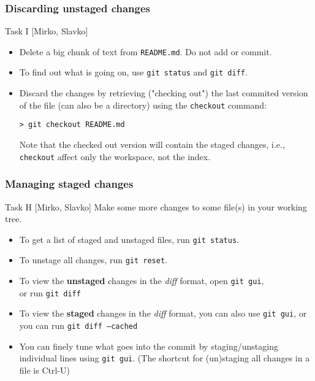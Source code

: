 \begin{frame}[fragile]
	\frametitle{Discarding unstaged changes}

	\begin{block}{Task I [Mirko, Slavko]}
	\begin{itemize}
	\item Delete a big chunk of text from \texttt{README.md}. Do not add or commit.

	\item To find out what is going on, use \texttt{git status} and \texttt{git diff}.
	\medskip
    \item Discard the changes by retrieving ("checking out") the last commited version of the file (can also be a directory) using the \texttt{checkout} command:

	\begin{verbatim}
> git checkout README.md
	\end{verbatim}

	Note that the checked out version will contain the staged changes, i.e., \texttt{checkout} affect only the workspace, not the index.
	\end{itemize}
	\end{block}
\end{frame}


\begin{frame}

\frametitle{Managing staged changes}

	\begin{block}{Task H [Mirko, Slavko]}
	Make some more changes to some file(s) in your working tree.
	\end{block}
	\begin{itemize}	
	
	\item To get a list of staged and unstaged files, run \texttt{git status}.
	\item To unstage all changes, run \texttt{git reset}.
	\item To view the \textbf{unstaged} changes in the \textit{diff} format, open \texttt{git gui}, 
	\\or run \texttt{git diff}

	\item To view the \textbf{staged} changes in the \textit{diff} format, you can also use \texttt{git gui}, or you can run \texttt{git diff --cached}
	
	\item You can finely tune what goes into the commit by staging/unstaging individual lines using \texttt{git gui}.
	(The shortcut for (un)staging all changes in a file is Ctrl-U)
	\end{itemize}
	
\end{frame}

